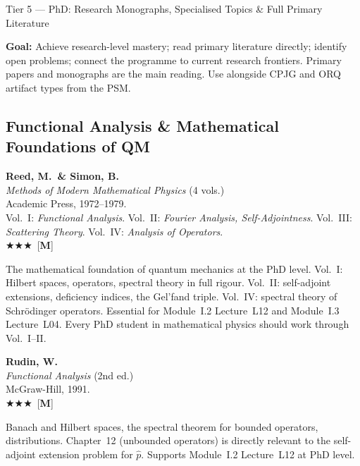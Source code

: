 \documentclass[11pt,a4paper]{article}
\newcommand{\essential}{$\bigstar\bigstar\bigstar$}
\newenvironment{bibentry}[1]{\begin{tcolorbox}[entrybox=#1,top=4pt,bottom=4pt]}{\end{tcolorbox}\smallskip}
\begin{document}
\begin{tcolorbox}[tierheader=t5red]
Tier 5 --- PhD: Research Monographs, Specialised Topics \& Full Primary Literature
\end{tcolorbox}

\medskip
\begin{tcolorbox}[keybox]
\textbf{Goal:} Achieve research-level mastery; read primary literature directly;
identify open problems; connect the programme to current research frontiers.
Primary papers and monographs are the main reading. Use alongside CPJG and ORQ
artifact types from the PSM.
\end{tcolorbox}

\subsection{Functional Analysis \& Mathematical Foundations of QM}

\begin{bibentry}{t5light}
\textbf{Reed, M.\ \& Simon, B.}\\
\textit{Methods of Modern Mathematical Physics} (4 vols.)\\
Academic Press, 1972--1979.\\
Vol.~I: \textit{Functional Analysis}. Vol.~II: \textit{Fourier Analysis, Self-Adjointness}.
Vol.~III: \textit{Scattering Theory}. Vol.~IV: \textit{Analysis of Operators}.\\[3pt]
\essential\ [\textbf{M}]\\[3pt]
\begin{tcolorbox}[annotbox]
The mathematical foundation of quantum mechanics at the PhD level.
Vol.~I: Hilbert spaces, operators, spectral theory in full rigour.
Vol.~II: self-adjoint extensions, deficiency indices, the Gel'fand triple.
Vol.~IV: spectral theory of Schr\"odinger operators.
Essential for Module~I.2 Lecture~L12 and Module~I.3 Lecture~L04.
Every PhD student in mathematical physics should work through Vol.~I--II.
\end{tcolorbox}
\end{bibentry}

\begin{bibentry}{t5light}
\textbf{Rudin, W.}\\
\textit{Functional Analysis} (2nd ed.)\\
McGraw-Hill, 1991.\\[3pt]
\essential\ [\textbf{M}]\\[3pt]
\begin{tcolorbox}[annotbox]
Banach and Hilbert spaces, the spectral theorem for bounded operators, distributions.
Chapter~12 (unbounded operators) is directly relevant to the self-adjoint extension
problem for $\hat{p}$. Supports Module~I.2 Lecture~L12 at PhD level.
\end{tcolorbox}
\end{bibentry}
\end{document}
